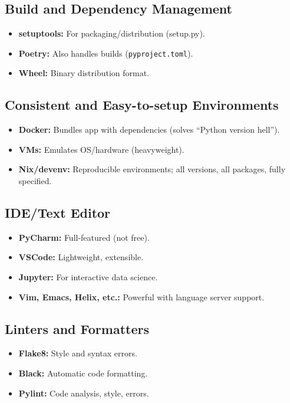 \documentclass[11pt,a4paper]{article}
\begin{document}
\subsection*{Build and Dependency Management}
\begin{itemize}
    \item \textbf{setuptools:} For packaging/distribution (setup.py).
    \item \textbf{Poetry:} Also handles builds (\texttt{pyproject.toml}).
    \item \textbf{Wheel:} Binary distribution format.
\end{itemize}

\subsection*{Consistent and Easy-to-setup Environments}
\begin{itemize}
    \item \textbf{Docker:} Bundles app with dependencies (solves ``Python version hell'').
    \item \textbf{VMs:} Emulates OS/hardware (heavyweight).
    \item \textbf{Nix/devenv:} Reproducible environments; all versions, all packages, fully specified.
\end{itemize}

\subsection*{IDE/Text Editor}
\begin{itemize}
    \item \textbf{PyCharm:} Full-featured (not free).
    \item \textbf{VSCode:} Lightweight, extensible.
    \item \textbf{Jupyter:} For interactive data science.
    \item \textbf{Vim, Emacs, Helix, etc.:} Powerful with language server support.
\end{itemize}

\subsection*{Linters and Formatters}
\begin{itemize}
    \item \textbf{Flake8:} Style and syntax errors.
    \item \textbf{Black:} Automatic code formatting.
    \item \textbf{Pylint:} Code analysis, style, errors.
\end{itemize}
\end{document}
